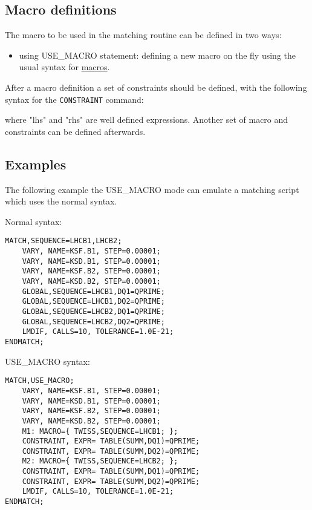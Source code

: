 \subsection{Macro definitions}
The macro to be used in the matching routine can be defined in two ways:
 
\begin{itemize}
\item using USE\_MACRO statement:
  defining a new macro on the fly using the usual syntax for
  \href{../control/special.html#macro}{ macros}.  
\end{itemize}
 
After a macro definition a set of constraints should be defined, with
the following syntax for the \texttt{CONSTRAINT} command:
 

where "lhs" and "rhs" are well defined \madx expressions. 
Another set of macro and constraints can be defined afterwards. 

\subsection{Examples}
The following example the USE\_MACRO mode can emulate a matching script
which uses the normal syntax. 

Normal syntax:

\begin{verbatim}
MATCH,SEQUENCE=LHCB1,LHCB2;
    VARY, NAME=KSF.B1, STEP=0.00001;
    VARY, NAME=KSD.B1, STEP=0.00001;
    VARY, NAME=KSF.B2, STEP=0.00001;
    VARY, NAME=KSD.B2, STEP=0.00001;
    GLOBAL,SEQUENCE=LHCB1,DQ1=QPRIME;
    GLOBAL,SEQUENCE=LHCB1,DQ2=QPRIME;
    GLOBAL,SEQUENCE=LHCB2,DQ1=QPRIME;
    GLOBAL,SEQUENCE=LHCB2,DQ2=QPRIME;
    LMDIF, CALLS=10, TOLERANCE=1.0E-21;
ENDMATCH;
\end{verbatim}

USE\_MACRO syntax:

\begin{verbatim}
MATCH,USE_MACRO;
    VARY, NAME=KSF.B1, STEP=0.00001;
    VARY, NAME=KSD.B1, STEP=0.00001;
    VARY, NAME=KSF.B2, STEP=0.00001;
    VARY, NAME=KSD.B2, STEP=0.00001;
    M1: MACRO={ TWISS,SEQUENCE=LHCB1; };
    CONSTRAINT, EXPR= TABLE(SUMM,DQ1)=QPRIME;
    CONSTRAINT, EXPR= TABLE(SUMM,DQ2)=QPRIME;
    M2: MACRO={ TWISS,SEQUENCE=LHCB2; };
    CONSTRAINT, EXPR= TABLE(SUMM,DQ1)=QPRIME;
    CONSTRAINT, EXPR= TABLE(SUMM,DQ2)=QPRIME;
    LMDIF, CALLS=10, TOLERANCE=1.0E-21;
ENDMATCH;
\end{verbatim}

